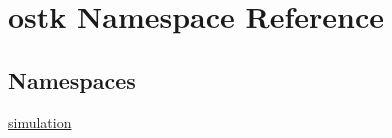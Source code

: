 \hypertarget{namespaceostk}{}\section{ostk Namespace Reference}
\label{namespaceostk}
\subsection*{Namespaces}
\begin{DoxyCompactItemize}
\item 
 \hyperlink{namespaceostk_1_1simulation}{simulation}
\end{DoxyCompactItemize}
